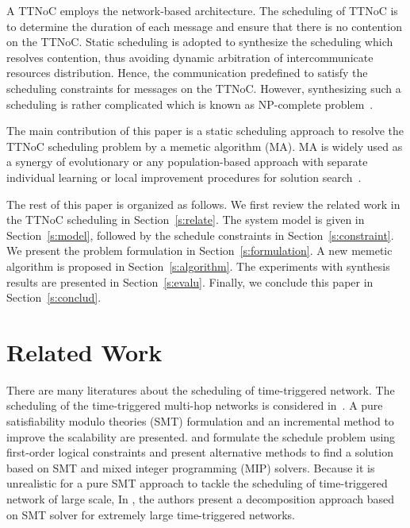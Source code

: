 \documentclass[10pt,journal]{IEEEtran}
\theoremstyle{remark}
\begin{document}
A TTNoC employs the network-based architecture.
The scheduling of TTNoC is to determine the duration of each message and ensure that there is no contention on the TTNoC. 
Static scheduling is adopted to synthesize the scheduling which resolves contention,
thus avoiding dynamic arbitration of intercommunicate resources distribution. 
Hence, the communication predefined to satisfy the scheduling constraints for messages on the TTNoC.
However,
 synthesizing such a scheduling is rather complicated which is known as NP-complete problem~\cite{DBLP:conf/date/HuangBRBK12,DBLP:conf/rtss/Steiner10}.

The main contribution of this paper is a static scheduling approach to resolve the TTNoC scheduling problem by a memetic algorithm (MA). 
MA is widely used as a synergy of evolutionary or any population-based approach with separate individual learning or local improvement procedures for solution search~\cite{DBLP:journals/tec/ChenOLT11}. 

The rest of this paper is organized as follows. 
We first review the related work in the TTNoC scheduling in Section~\ref{s:relate}. 
The system model is given in Section~\ref{s:model},
 followed by the schedule constraints in Section~\ref{s:constraint}.
We present the problem formulation in Section~\ref{s:formulation}.
A new memetic algorithm is proposed in Section~\ref{s:algorithm}.
The experiments with synthesis results are presented in Section~\ref{s:evalu}.
Finally, we conclude this paper in Section~\ref{s:conclud}.

\section{Related Work	\label{s:relate}}

There are many literatures about the scheduling of time-triggered network.
The scheduling of the time-triggered multi-hop networks is considered in~\cite{DBLP:conf/rtss/Steiner10}.
A pure satisfiability modulo theories (SMT) formulation and an incremental method to improve the scalability are presented.
\cite{DBLP:journals/rts/CraciunasO16} and \cite{DBLP:conf/rtns/CraciunasO14} formulate the schedule problem using first-order logical constraints and present alternative methods to find a solution based on SMT and mixed integer programming (MIP) solvers.
Because it is unrealistic for a pure SMT approach to tackle the scheduling of time-triggered network of large scale,
 In \cite{DBLP:conf/etfa/PozoSRH15},
  the authors present a decomposition approach based on SMT solver for extremely large time-triggered networks.
\end{document}

